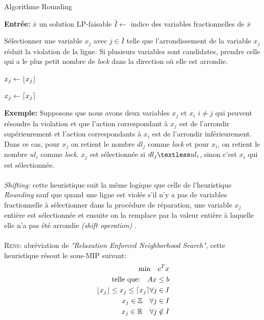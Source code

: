 \documentclass[12pt,a4paper,oneside]{book}
\theoremstyle{definition}
\newcommand{\R}{\mathbb{R}}
\DeclarePairedDelimiter\ceil{\lceil}{\rceil}
\DeclarePairedDelimiter\floor{\lfloor}{\rfloor}
\begin{document}
		\begin{algorithm} \label{rounding}
			\caption{Algorithme Rounding}
			\SetAlgoLined
			\DontPrintSemicolon
			\textbf{Entrée:} $\bar{x}$ un solution LP-faisable \;
			$\bar{I} \gets $ indice des variables fractionnelles de $\bar{x}$ \;
			{
				{
					Sélectionner une variable $x_j$ avec $ j \in \bar{I}$ telle que l'arrondissement de la variable $x_j$ réduit la violation de la ligne. Si plusieurs variables sont candidates, prendre celle qui a le plus petit nombre de \textit{lock} dans la direction où elle est arrondie. \;
				}
				{
					{
						$x_j \gets \floor{x_j} $ \;
					}
					{
						
						$x_j \gets \ceil{x_j} $ \;
					}
				}
			}
		
		\end{algorithm}

	\textbf{Exemple:}
	Supposons que nous avons deux variables $x_j$ et $x_i$ $ i \neq j$ qui peuvent résoudre la violation et que l'action correspondant à $x_j$ est de l'arrondir supérieurement et l'action correspondants à $x_i$ est de l'arrondir inférieurement. Dans ce cas, pour $x_j$ on retient le nombre $dl_j$ comme \textit{lock} et pour $x_i$, on retient le nombre $ul_i$ comme \textit{lock}. $x_j$ est sélectionnée si $dl_j \textless ul_i$, sinon c'est $x_i$ qui est sélectionnée.  
	
	
	\paragraph{}
	\textit{Shifting:} cette heuristique suit la même logique que celle de l'heuristique \textit{Rounding} sauf que quand une ligne est violée s'il n'y a pas de variables fractionnelle à sélectionner dans la procédure de réparation, une variable $x_j$ entière est sélectionnée et ensuite on la remplace par la valeur entière à laquelle elle n'a pas été arrondie \textit{(shift operation)} \cite{berthold2006}.
	
	
	\paragraph{}
	\textsc{Rens:} abréviation de \textit{"Relaxation Enforced Neighborhood Search"}, cette heuristique résout le sous-MIP suivant:
	\begin{equation}
		\begin{aligned}
		\text{min} \hspace{10pt}  c^T x \\
		\text{telle que:} \hspace{10pt} Ax \leq b \\ 
		\floor{x_j} \leq x_j \leq \ceil{x_j} \forall j \in I \\
		x_j \in \mathbb{Z} \hspace{10pt} \forall j \in I \\
		 x_j \in \R \hspace{10pt} \forall j \notin I
		\end{aligned}
	\end{equation}
	
\end{document}
